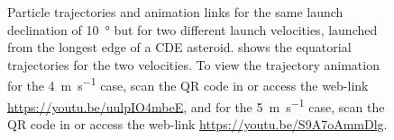 \begin{figure}[htb]
\qquad
{}
\caption{Particle trajectories and animation links for the same launch declination of \SI{10}{\degree} but for two different launch velocities, launched from the longest edge of a \gls{CDE} asteroid. \protect{} shows the equatorial trajectories for the two velocities. To view the trajectory animation for the \SI{4}{\metre\per\second} case, scan the QR code in \protect{} or access the web-link \protect\url{https://youtu.be/uulpIO4mbeE}, and for the \SI{5}{\metre\per\second} case, scan the QR code in \protect{} or access the web-link \protect\url{https://youtu.be/S9A7oAmmDlg}.}
\label{fig:non_conservative_10Decl_4and5_launchVel}
\end{figure}
\FloatBarrier

